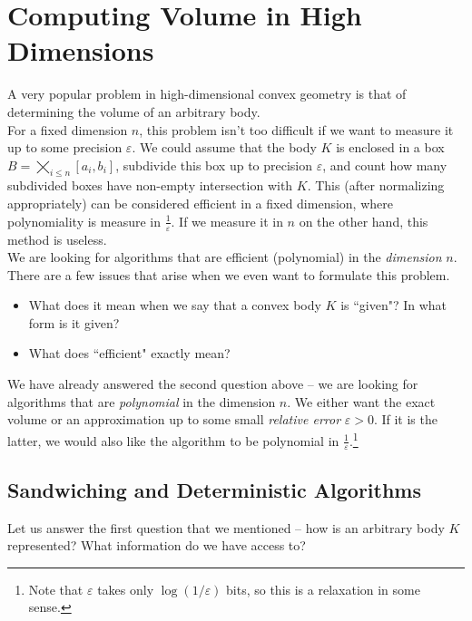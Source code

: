 \section{Computing Volume in High Dimensions}

A very popular problem in high-dimensional convex geometry is that of determining the volume of an arbitrary body.\\

For a fixed dimension $n$, this problem isn't too difficult if we want to measure it up to some precision $\varepsilon$. We could assume that the body $K$ is enclosed in a box $B=\bigtimes_{i\leq n}[a_i,b_i]$, subdivide this box up to precision $\varepsilon$, and count how many subdivided boxes have non-empty intersection with $K$. This (after normalizing appropriately) can be considered efficient in a fixed dimension, where polynomiality is measure in $\frac{1}{\varepsilon}$. If we measure it in $n$ on the other hand, this method is useless.\\
We are looking for algorithms that are efficient (polynomial) in the \textit{dimension} $n$.\\

There are a few issues that arise when we even want to formulate this problem.
\begin{itemize}
	\item What does it mean when we say that a convex body $K$ is ``given"? In what form is it given?
	\item What does ``efficient" exactly mean?
\end{itemize}

We have already answered the second question above -- we are looking for algorithms that are \textit{polynomial} in the dimension $n$. We either want the exact volume or an approximation up to some small \textit{relative error} $\varepsilon>0$. If it is the latter, we would also like the algorithm to be polynomial in $\frac{1}{\varepsilon}$.\footnote{Note that $\varepsilon$ takes only $\log(1/\varepsilon)$ bits, so this is a relaxation in some sense.}

\subsection{Sandwiching and Deterministic Algorithms}
\label{subsec: sandwiching and deterministic algorithms}

Let us answer the first question that we mentioned -- how is an arbitrary body $K$ represented? What information do we have access to?

